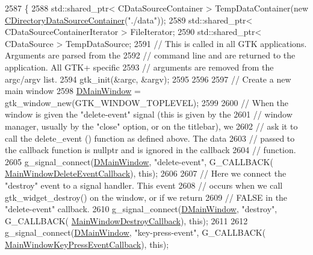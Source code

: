 \begin{DoxyCode}
2587                                                 \{
2588     std::shared\_ptr< CDataSourceContainer > TempDataContainer(\textcolor{keyword}{new} 
      \hyperlink{classCDirectoryDataSourceContainer}{CDirectoryDataSourceContainer}(\textcolor{stringliteral}{"./data"}));
2589     std::shared\_ptr< CDataSourceContainerIterator > FileIterator;
2590     std::shared\_ptr< CDataSource > TempDataSource;
2591     \textcolor{comment}{// This is called in all GTK applications. Arguments are parsed from the }
2592     \textcolor{comment}{// command line and are returned to the application. All GTK+ specific }
2593     \textcolor{comment}{// arguments are removed from the argc/argv list.}
2594     gtk\_init(&argc, &argv);
2595     
2596     
2597     \textcolor{comment}{// Create a new main window }
2598     \hyperlink{classCApplicationData_af3c57a84b4ecca8a7f86b67a0ae55372}{DMainWindow} = gtk\_window\_new(GTK\_WINDOW\_TOPLEVEL);
2599     
2600     \textcolor{comment}{// When the window is given the "delete-event" signal (this is given by the }
2601     \textcolor{comment}{// window manager, usually by the "close" option, or on the titlebar), we }
2602     \textcolor{comment}{// ask it to call the delete\_event () function as defined above. The data }
2603     \textcolor{comment}{// passed to the callback function is nullptr and is ignored in the callback }
2604     \textcolor{comment}{// function. }
2605     g\_signal\_connect(\hyperlink{classCApplicationData_af3c57a84b4ecca8a7f86b67a0ae55372}{DMainWindow}, \textcolor{stringliteral}{"delete-event"}, G\_CALLBACK(
      \hyperlink{classCApplicationData_a4b2110c03e030cf11b733955963f8854}{MainWindowDeleteEventCallback}), \textcolor{keyword}{this});
2606     
2607     \textcolor{comment}{// Here we connect the "destroy" event to a signal handler. This event }
2608     \textcolor{comment}{// occurs when we call gtk\_widget\_destroy() on the window, or if we return }
2609     \textcolor{comment}{// FALSE in the "delete-event" callback. }
2610     g\_signal\_connect(\hyperlink{classCApplicationData_af3c57a84b4ecca8a7f86b67a0ae55372}{DMainWindow}, \textcolor{stringliteral}{"destroy"}, G\_CALLBACK(
      \hyperlink{classCApplicationData_a379327c78dc57aa9dcef77e1b98efa2d}{MainWindowDestroyCallback}), \textcolor{keyword}{this});
2611     
2612     g\_signal\_connect(\hyperlink{classCApplicationData_af3c57a84b4ecca8a7f86b67a0ae55372}{DMainWindow}, \textcolor{stringliteral}{"key-press-event"}, G\_CALLBACK(
      \hyperlink{classCApplicationData_aca6cce5b1cd5142984d2880294ff6ed4}{MainWindowKeyPressEventCallback}), \textcolor{keyword}{this});

\end{DoxyCode}
